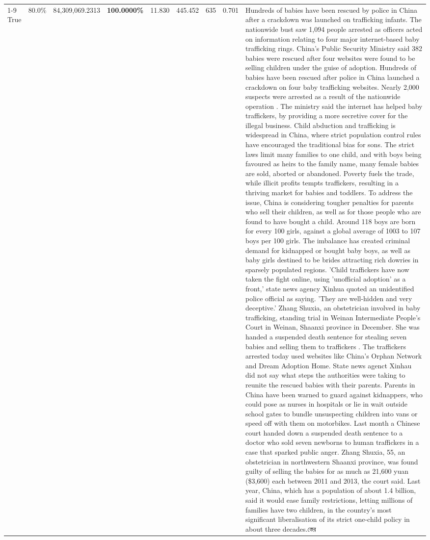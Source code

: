 \begin{table}[H]
\begin{tabular}{lllrlllll}
\cline{1-9}
True & 80.0\% & 84,309,069.2313 & \bfseries \color{red} 100.0000\% & 11.830 & 445.452 & 635 & 0.701 & Hundreds of babies have been rescued by police in China after a crackdown was launched on trafficking infants. The nationwide bust saw 1,094 people arrested as officers acted on information relating to four major internet-based baby trafficking rings. China's Public Security Ministry said 382 babies were rescued after four websites were found to be selling children under the guise of adoption. Hundreds of babies have been rescued after police in China launched a crackdown on four baby trafficking websites. Nearly 2,000 suspects were arrested as a result of the nationwide operation . The ministry said the internet has helped baby traffickers, by providing a more secretive cover for the illegal business. Child abduction and trafficking is widespread in China, where strict population control rules have encouraged the traditional bias for sons. The strict laws limit many families to one child, and with boys being favoured as heirs to the family name, many female babies are sold, aborted or abandoned. Poverty fuels the trade, while illicit profits tempts traffickers, resulting in a thriving market for babies and toddlers. To address the issue, China is considering tougher penalties for parents who sell their children, as well as for those people who are found to have bought a child. Around 118 boys are born for every 100 girls, against a global average of 1003 to 107 boys per 100 girls. The imbalance has created criminal demand for kidnapped or bought baby boys, as well as baby girls destined to be brides attracting rich dowries in sparsely populated regions. 'Child traffickers have now taken the fight online, using 'unofficial adoption' as a front,' state news agency Xinhua quoted an unidentified police official as saying. 'They are well-hidden and very deceptive.' Zhang Shuxia, an obstetrician involved in baby trafficking, standing trial in Weinan Intermediate People's Court in Weinan, Shaanxi province in December. She was handed a suspended death sentence for stealing seven babies and selling them to traffickers . The traffickers arrested today used websites like China's Orphan Network and Dream Adoption Home. State news agenct Xinhau did not say what steps the authorities were taking to reunite the rescued babies with their parents. Parents in China have been warned to guard against kidnappers, who could pose as nurses in hospitals or lie in wait outside school gates to bundle unsuspecting children into vans or speed off with them on motorbikes. Last month a Chinese court handed down a suspended death sentence to a doctor who sold seven newborns to human traffickers in a case that sparked public anger. Zhang Shuxia, 55, an obstetrician in northwestern Shaanxi province, was found guilty of selling the babies for as much as 21,600 yuan (\$3,600) each between 2011 and 2013, the court said. Last year, China, which has a population of about 1.4 billion, said it would ease family restrictions, letting millions of families have two children, in the country's most significant liberalisation of its strict one-child policy in about three decades.স্তের \\

\end{tabular}
\end{table}

